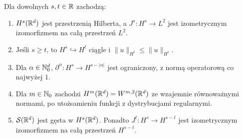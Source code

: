 \begin{twierdzenie}
\label{thm:dt-Hs}
Dla dowolnych $s,t\in\mathbb R$ zachodzą:
\begin{enumerate}
\item $H^s(\mathbb R^d)$ jest przestrzenią Hilberta, a
 $J^s:H^s\to L^2$ jest izometrycznym izomorfizmem
 na całą przestrzeń $L^2$.
\item Jeśli $s\ge t$, to $H^s\hookrightarrow H^t$
 ciągle i $\|u\|_{H^t}\le\|u\|_{H^s}$.
\item Dla $\alpha\in\mathbb N_0^d$, $\partial^\alpha:H^s\to
 H^{s-|\alpha|}$ jest ograniczony, z normą
 operatorową co najwyżej $1$.
\item Dla $m\in\mathbb N_0$ zachodzi $H^m(\mathbb R^d)=W^{m,2}(\mathbb R^d)$
 ze wzajemnie równoważnymi normami, po utożsamieniu
 funkcji z dystrybucjami regularnymi.
\item $\mathcal S(\mathbb R^d)$ jest gęsta w $H^s(\mathbb R^d)$.
 Ponadto $J^t:H^s\to H^{s-t}$ jest izometrycznym
 izomorfizmem na całą przestrzeń $H^{s-t}$.
\end{enumerate}
\end{twierdzenie}
